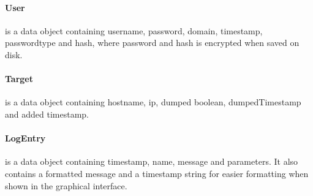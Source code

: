 \documentclass{article}
\begin{document}
\paragraph{User} is a data object containing username, password, domain, timestamp, passwordtype and hash, where password and hash is encrypted when saved on disk.
\paragraph{Target} is a data object containing hostname, ip, dumped boolean, dumpedTimestamp and added timestamp.
\paragraph{LogEntry} is a data object containing timestamp, name, message and parameters. It also contains a formatted message and a timestamp string for easier formatting when shown in the graphical interface.
\end{document}
